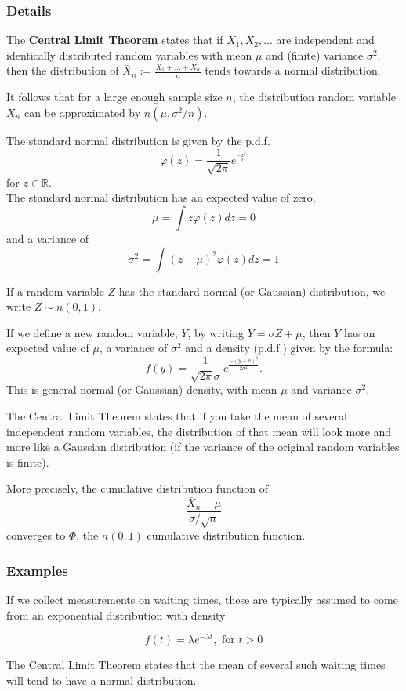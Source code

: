 \documentclass[12pt,a4paper]{article}
\theoremstyle{regla}
\theoremstyle{remark}
\theoremstyle{definition}
\theoremstyle{nonumberbreak}
\begin{document}
\subsubsection{Details}
\begin{thm}
The {\bf Central Limit Theorem} states that if $X_1, X_2, \ldots$ are independent and identically 
distributed random variables with mean $\mu$ and (finite) variance $\sigma^2$, 
then the distribution of $\bar{X}_n:= \frac{X_1+\dots+X_n}{n}$ tends towards a normal distribution. 
\end{thm}

It follows that for a large enough sample size $n$, 
the distribution random variable $\bar{X}_n$ can be approximated by $n(\mu,\sigma^2/n)$.

The standard normal distribution is given by the p.d.f.\\
$$
\varphi(z) = \frac{1}{\sqrt{2\pi}} e^{\frac{-z^2}{2}}$$ 
 for $z\in \mathbb{R}$.\\

The standard normal distribution has an expected value of zero, 
$$
\mu = \int z\varphi (z)dz =0
$$
and a variance of 
$$
\sigma^2 = \int ({z-\mu})^2 \varphi(z)dz=1
$$

If a random variable $Z$ has the standard normal (or Gaussian)  distribution, we write $Z\sim n(0,1)$. 

If we define a new random variable, $Y$, by writing $Y=\sigma Z + \mu$, then $Y$ has an expected value of $\mu$, a variance of $\sigma^2$ and a density (p.d.f.) given by the formula:
$$
f(y) = \frac{1}{\sqrt{2\pi}\sigma}   \ e^{\frac{-(y-\mu)^2}{2\sigma^2}}.
$$
This is general normal (or Gaussian) density, with mean $\mu$ and variance $\sigma^2$.

The Central Limit Theorem states that if you take the mean of several independent random variables, the distribution of
that mean will look more and more like a Gaussian distribution (if the variance of the original random variables is finite).

More precisely, the cumulative distribution function of
$$
\frac{\bar{X}_n - \mu}{\sigma/\sqrt{n}}
$$
converges to $\Phi$, the $n(0,1)$ cumulative distribution function.


\subsubsection{Examples}
\begin{xmpl}
If we collect measurements on waiting times, these are typically assumed to come 
from an exponential distribution with density 

\begin{equation*}
f(t)=\lambda e^{-\lambda t},\textrm{ for } t>0 
\end{equation*}

The Central Limit Theorem states that the mean of several such waiting times will tend to have a normal distribution.
\end{xmpl}
\end{document}
